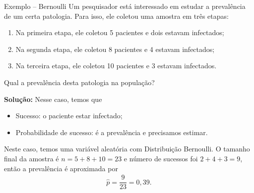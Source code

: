 \documentclass[8pt]{beamer}
\begin{document}
\begin{frame}{Exemplo -- Bernoulli}
 Um pesquisador está interessado em estudar a prevalência de um certa patologia. Para isso, ele coletou uma amostra em três etapas:
 \begin{enumerate}
  \item Na primeira etapa, ele coletou 5 pacientes e dois estavam infectados;
  \item Na segunda etapa, ele coletou 8 pacientes e 4 estavam infectados;
  \item Na terceira etapa, ele coletou 10 pacientes e 3 estavam infectados.
 \end{enumerate}
 Qual a prevalência desta patologia na população?
 \vfill
 
 \textbf{Solução:} Nesse caso, temos que 
 \begin{itemize}
  \item Sucesso: o paciente estar infectado;
  \item Probabilidade de sucesso: é a prevalência e precisamos estimar.
 \end{itemize}
Neste caso, temos uma variável aleatória com Distribuição Bernoulli. O tamanho final da amostra é $n=5+8+10=23$ e número de sucessos foi $2+4+3=9$, então a prevalência é aproximada por
\begin{align*}
 \hat{p} = \dfrac{9}{23}=0,39.
\end{align*}
\end{frame}
\end{document}
